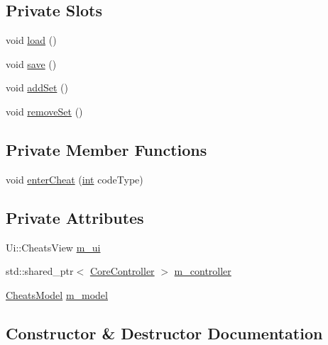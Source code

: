 \subsection*{Private Slots}
\begin{DoxyCompactItemize}
\item 
void \mbox{\hyperlink{class_q_g_b_a_1_1_cheats_view_ab2f5f900e87c57c53acf74e9bddbf680}{load}} ()
\item 
void \mbox{\hyperlink{class_q_g_b_a_1_1_cheats_view_acc7c4f014670cccb752cde7ad6e85597}{save}} ()
\item 
void \mbox{\hyperlink{class_q_g_b_a_1_1_cheats_view_a37f11e62a7ad23c33635ad8c128db91d}{add\+Set}} ()
\item 
void \mbox{\hyperlink{class_q_g_b_a_1_1_cheats_view_a43e93973388591b6a0d79dc046980561}{remove\+Set}} ()
\end{DoxyCompactItemize}
\subsection*{Private Member Functions}
\begin{DoxyCompactItemize}
\item 
void \mbox{\hyperlink{class_q_g_b_a_1_1_cheats_view_afac456331945de2dffbd8a51aa87f5c2}{enter\+Cheat}} (\mbox{\hyperlink{ioapi_8h_a787fa3cf048117ba7123753c1e74fcd6}{int}} code\+Type)
\end{DoxyCompactItemize}
\subsection*{Private Attributes}
\begin{DoxyCompactItemize}
\item 
Ui\+::\+Cheats\+View \mbox{\hyperlink{class_q_g_b_a_1_1_cheats_view_a86f2446f94a5233312615d6463e01fb6}{m\+\_\+ui}}
\item 
std\+::shared\+\_\+ptr$<$ \mbox{\hyperlink{class_q_g_b_a_1_1_core_controller}{Core\+Controller}} $>$ \mbox{\hyperlink{class_q_g_b_a_1_1_cheats_view_a98ecbddbbc4d99e00628517f32f752b3}{m\+\_\+controller}}
\item 
\mbox{\hyperlink{class_q_g_b_a_1_1_cheats_model}{Cheats\+Model}} \mbox{\hyperlink{class_q_g_b_a_1_1_cheats_view_a63b79a28b00e130233f9315cf516ad6f}{m\+\_\+model}}
\end{DoxyCompactItemize}


\subsection{Constructor \& Destructor Documentation}
\mbox{\label{class_q_g_b_a_1_1_cheats_view_a8e5acfbee04e60d9b7a7a44dacb33297}} 
